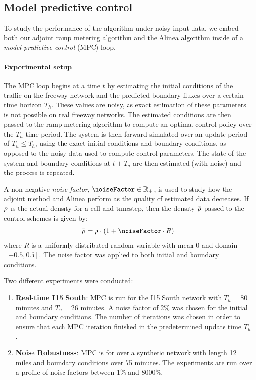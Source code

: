 								
\subsection{Model predictive control\label{sub:Model-predictive-control}}
								
To study the performance of the algorithm under noisy input data,
we embed both our adjoint ramp metering algorithm and the Alinea algorithm
inside of a \emph{model predictive control }(MPC) loop.
								
								
\paragraph{Experimental setup.}
								
The MPC loop begins at a time $t$ by estimating the initial conditions
of the traffic on the freeway network and the predicted boundary fluxes
over a certain time horizon $T_{h}$. These values are noisy, as exact
estimation of these parameters is not possible on real freeway networks.
The estimated conditions are then passed to the ramp metering algorithm
to compute an optimal control policy over the $T_{h}$ time period.
The system is then forward-simulated over an update period of $T_{u}\le T_{h}$,
using the exact initial conditions and boundary conditions, as opposed
to the noisy data used to compute control parameters. The state of
the system and boundary conditions at $t+T_{u}$ are then estimated
(with noise) and the process is repeated.
								
A non-negative\emph{ noise factor}, $\noiseFactor \in \R_+$, is used to study how the adjoint
method and Alinea perform as the quality of estimated data decreases. If $\rho_{}^{}$ is the actual density for a cell and timestep, then the density $\bar{\rho_{}^{}}$ passed to the control schemes is given by:
\[
\bar{\discrete{}{}}=\discrete{}{}\cdot \left(1+\noiseFactor\cdot R\right)
\]
where $R$ is a uniformly distributed random variable with mean $0$
and domain $\left[-0.5,0.5\right]$. The noise factor was applied
to both initial and boundary conditions.
								
Two different experiments were conducted:
\begin{enumerate}
	\item \textbf{Real-time I15 South}: MPC is run for the I15 South network
	with $T_{h}=80$ minutes and $T_{u}=26$ minutes. A noise factor of
	2\% was chosen for the initial and boundary conditions. The number
	of iterations was chosen in order to ensure that each MPC iteration
	finished in the predetermined update time $T_{u}$.
	\item \textbf{Noise Robustness}: MPC is for over a synthetic network with
	length 12 miles and boundary conditions over 75 minutes. The experiments
	are run over a profile of noise factors between 1\% and 8000\%.
\end{enumerate}
								
